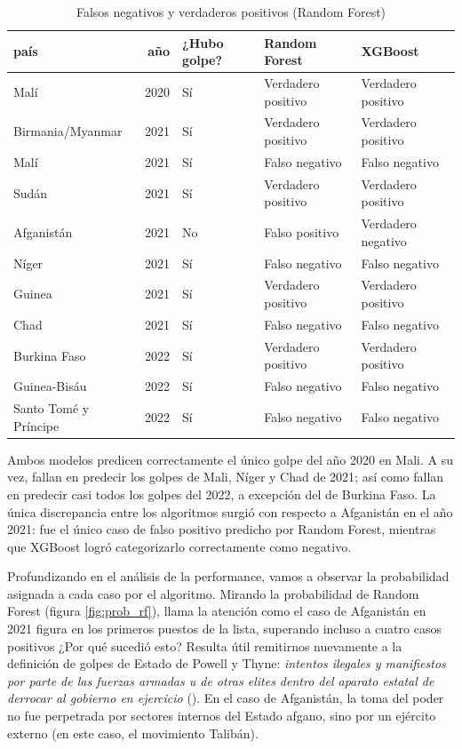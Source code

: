 \documentclass{article}
\begin{document}
\begin{table}[H]
 \centering
  \begin{tabular}{lrlll}
   \toprule
   país & año & ¿Hubo golpe? & Random Forest & XGBoost \\
   \midrule
   Malí & 2020 & Sí & Verdadero positivo & Verdadero positivo \\
   Birmania/Myanmar & 2021 & Sí & Verdadero positivo & Verdadero positivo \\
   Malí & 2021 & Sí & Falso negativo & Falso negativo \\
   Sudán & 2021 & Sí & Verdadero positivo & Verdadero positivo \\
   Afganistán & 2021 & No & Falso positivo & Verdadero negativo \\
   Níger & 2021 & Sí & Falso negativo & Falso negativo \\
   Guinea & 2021 & Sí & Verdadero positivo & Verdadero positivo \\
   Chad & 2021 & Sí & Falso negativo & Falso negativo \\
   Burkina Faso & 2022 & Sí & Verdadero positivo & Verdadero positivo \\
   Guinea-Bisáu & 2022 & Sí & Falso negativo & Falso negativo \\
   Santo Tomé y Príncipe & 2022 & Sí & Falso negativo & Falso negativo \\
   \bottomrule
  \end{tabular}
 \caption{Falsos negativos y verdaderos positivos (Random Forest) \label{tab:resultados}}
\end{table}

Ambos modelos predicen correctamente el único golpe del año 2020 en Mali. A su
vez, fallan en predecir los golpes de Mali, Níger y Chad de 2021; así como fallan en predecir
casi todos los golpes del 2022, a excepción del de Burkina Faso. La única discrepancia entre
los algoritmos surgió con respecto a Afganistán en el año 2021: fue el único caso de falso
positivo predicho por Random Forest, mientras que XGBoost logró categorizarlo correctamente
como negativo.

Profundizando en el análisis de la performance, vamos a observar la probabilidad asignada
a cada caso por el algoritmo. Mirando la probabilidad de Random Forest 
(figura \ref{fig:prob_rf}), llama la atención como el caso de Afganistán en 2021 figura
en los primeros puestos de la lista, superando incluso a cuatro casos positivos ¿Por qué sucedió esto?
Resulta útil remitirnos nuevamente a la definición de golpes de Estado de Powell y Thyne:
\textit{intentos ilegales y manifiestos por parte de las fuerzas armadas u de otras elites dentro
del aparato estatal de derrocar al gobierno en ejercicio} (\cite[p.~252]{Pow11}). En el caso de 
Afganistán, la toma del poder no fue perpetrada por sectores internos del Estado afgano, sino
por un ejército externo (en este caso, el movimiento Talibán).
\end{document}
